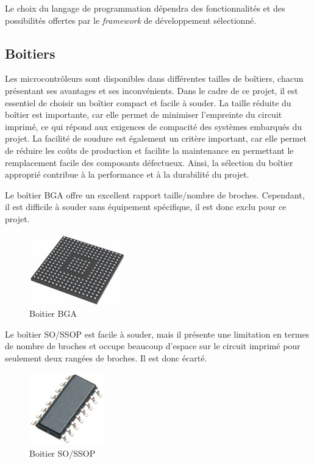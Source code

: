 Le choix du langage de programmation dépendra des fonctionnalités et des possibilités offertes par le \textit{\gls{framework}} de développement sélectionné.

\subsection{Boitiers}

Les microcontrôleurs sont disponibles dans différentes tailles de boîtiers, chacun présentant ses avantages et ses inconvénients.
Dans le cadre de ce projet, il est essentiel de choisir un boîtier compact et facile à souder.
La taille réduite du boîtier est importante, car elle permet de minimiser l'empreinte du circuit imprimé, ce qui répond aux exigences de compacité des systèmes embarqués du projet.
La facilité de soudure est également un critère important, car elle permet de réduire les coûts de production et facilite la maintenance en permettant le remplacement facile des composants défectueux.
Ainsi, la sélection du boîtier approprié contribue à la performance et à la durabilité du projet.

Le boîtier BGA offre un excellent rapport taille/nombre de broches.
Cependant, il est difficile à souder sans équipement spécifique, il est donc exclu pour ce projet.

\begin{figure}[H]
    \centering
    \includegraphics[scale=0.4]{./assets/figures/bga.jpg}
    \caption{\cite{bga} Boitier BGA}
\end{figure}

Le boîtier SO/SSOP est facile à souder, mais il présente une limitation en termes de nombre de broches et occupe beaucoup d'espace sur le circuit imprimé pour seulement deux rangées de broches.
Il est donc écarté.

\begin{figure}[H]
    \centering
    \includegraphics[scale=0.45]{./assets/figures/so_ssop.jpg}
    \caption{\cite{so_ssop} Boitier SO/SSOP}
\end{figure}

